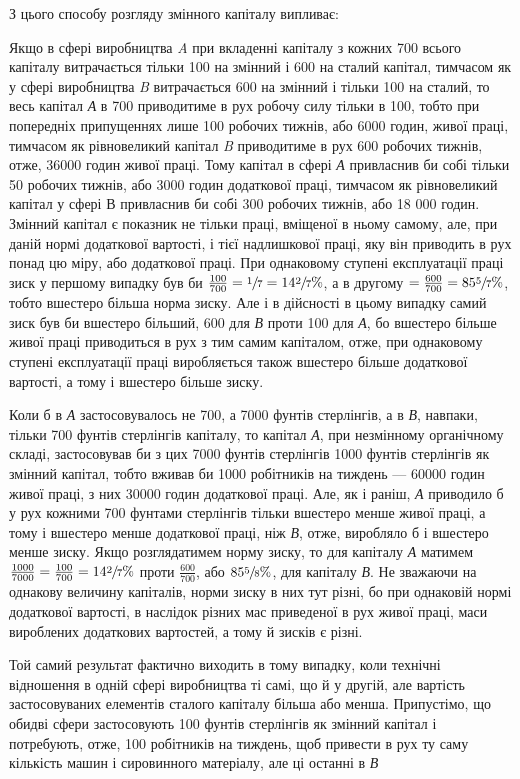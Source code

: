 З цього способу розгляду змінного капіталу випливає:

Якщо в сфері виробництва \emph{A} при вкладенні капіталу з кожних 700 всього капіталу витрачається тільки
100 на змінний
і 600 на сталий капітал, тимчасом як у сфері виробництва \emph{B}
витрачається 600 на змінний і тільки 100 на сталий, то весь
капітал \emph{А} в 700 приводитиме в рух робочу силу тільки в 100,
тобто при попередніх припущеннях лише 100 робочих тижнів,
або 6000 годин, живої праці, тимчасом як рівновеликий капітал \emph{B} приводитиме в рух 600 робочих
тижнів, отже, 36000 годин живої праці. Тому капітал в сфері \emph{А} привласнив би собі тільки
50 робочих тижнів, або 3000 годин додаткової праці, тимчасом
як рівновеликий капітал у сфері В привласнив би собі 300 робочих тижнів, або 18 000 годин. Змінний
капітал є показник не
тільки праці, вміщеної в ньому самому, але, при даній нормі
додаткової вартості, і тієї надлишкової праці, яку він приводить
в рух понад цю міру, або додаткової праці. При однаковому
ступені експлуатації праці зиск у першому випадку був би $\frac{100}{700} = \sfrac{1}{7} = 14\sfrac{2}{7}\%$, а
в другому $= \frac{600}{700} = 85\sfrac{5}{7}\%$, тобто вшестеро
більша норма зиску. Але і в дійсності в цьому випадку самий
зиск був би вшестеро більший, 600 для \emph{В} проти 100 для \emph{А}, бо
вшестеро більше живої праці приводиться в рух з тим самим
капіталом, отже, при однаковому ступені експлуатації праці
виробляється також вшестеро більше додаткової вартості, а тому
і вшестеро більше зиску.

Коли б в \emph{А} застосовувалось не 700, а 7000 фунтів стерлінгів, а в \emph{В}, навпаки, тільки 700 фунтів
стерлінгів капіталу, то
капітал \emph{А}, при незмінному органічному складі, застосовував би
з цих 7000 фунтів стерлінгів 1000 фунтів стерлінгів як змінний
капітал, тобто вживав би 1000 робітників на тиждень — 60000 годин живої праці, з них 30000 годин
додаткової праці. Але,
як і раніш, \emph{А} приводило б у рух кожними 700 фунтами стерлінгів тільки вшестеро менше живої праці, а
тому і вшестеро
менше додаткової праці, ніж \emph{В}, отже, виробляло б і вшестеро
менше зиску. Якщо розглядатимем норму зиску, то для капіталу \emph{А} матимем $\frac{1000}{7000} = \frac{100}{700} = 14\sfrac{2}{7}\%$
проти $\frac{600}{700}$, або $85\sfrac{5}{8}\%$, для
капіталу \emph{В}. Не зважаючи на однакову величину капіталів, норми
зиску в них тут різні, бо при однаковій нормі додаткової
вартості, в наслідок різних мас приведеної в рух живої праці,
маси вироблених додаткових вартостей, а тому й зисків є різні.

Той самий результат фактично виходить в тому випадку, коли
технічні відношення в одній сфері виробництва ті самі, що й
у другій, але вартість застосовуваних елементів сталого капіталу більша або менша. Припустімо, що
обидві сфери застосовують 100 фунтів стерлінгів як змінний капітал і потребують, отже, 100
робітників на тиждень, щоб привести в рух ту саму
кількість машин і сировинного матеріалу, але ці останні в \emph{В}
\parbreak{}  %
